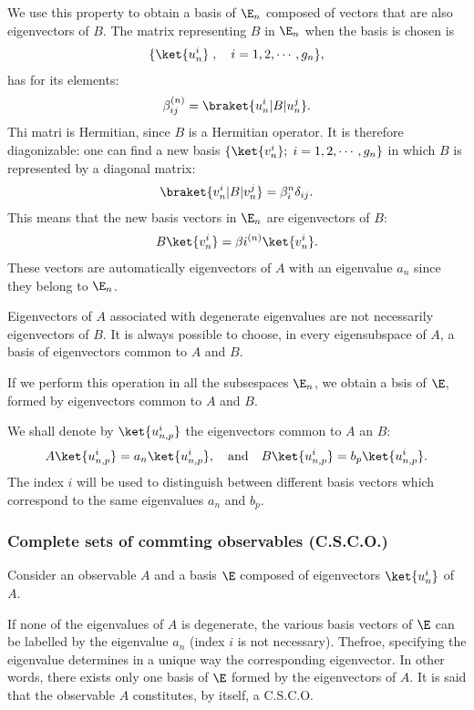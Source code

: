 We use this property to obtain a basis of $\E_n$ composed of vectors that are also eigenvectors of $B$. The matrix representing $B$ in $\E_n$ when the basis is chosen is
\begin{align}
    \{\ket{u_n^i}\;,\quad i=1,2,\cdots,g_n\},
\end{align}
has for its elements:
\begin{align}
    \beta_{ij}^{(n)}=\braket{u_n^i|B|u_n^j}.
\end{align}
Thi matri is Hermitian, since $B$ is a Hermitian operator. It is therefore diagonizable: one can find a new basis $\{\ket{v_n^i};\;i=1,2,\cdots,g_n\}$ in which $B$ is 
represented by a diagonal matrix:
\begin{align}
    \braket{v_n^i|B|v_n^j}=\beta^{n}_i\delta_{ij}.
\end{align}
This means that the new basis vectors in $\E_n$ are eigenvectors of $B$:
\begin{align}
    B\ket{v_n^i}=\beta{i^{(n)}}\ket{v_n^i}.
\end{align}
These vectors are automatically eigenvectors of $A$ with an eigenvalue $a_n$ since they belong to $\E_n$.

\begin{emphasizer}
Eigenvectors of $A$ associated with degenerate eigenvalues are not necessarily eigenvectors of $B$. It is always possible to choose, in every eigensubspace of $A$, a basis 
of eigenvectors common to $A$ and $B$.    
\end{emphasizer}
If we perform this operation in all the subsespaces $\E_n$, we obtain a bsis of $\E$, formed by eigenvectors common to $A$ and $B$.


We shall denote by $\ket{u_{n,p}^i}$ the eigenvectors common to $A$ an $B$:
\begin{align}
    A\ket{u_{n,p}^i}=a_n\ket{u_{n,p}^i},\quad\text{and}\quad B\ket{u_{n,p}^i}=b_p\ket{u_{n,p}^i}.
\end{align} 
The index $i$ will be used to distinguish between different basis vectors which correspond to the same eigenvalues $a_n$ and $b_p$.

\subsubsection{Complete sets of commting observables (C.S.C.O.)}
Consider an observable $A$ and a basis $\E$ composed of eigenvectors $\ket{u_n^i}$ of $A$.

If none of the eigenvalues of $A$ is degenerate, the various basis vectors of $\E$ can be labelled by the eigenvalue $a_n$ (index $i$ is not necessary). Thefroe,
specifying the eigenvalue determines in a unique way the corresponding eigenvector. In other words, there exists only one basis of $\E$ formed by 
the eigenvectors of $A$. It is said that the observable $A$ constitutes, by itself, a C.S.C.O.

